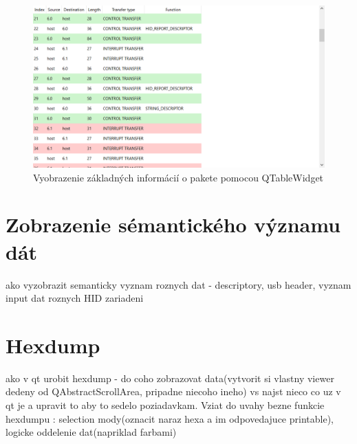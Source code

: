 \begin{figure}[!htb]
	\centering
	\includegraphics[width=\textwidth]{img/kap03_TableViewLookColor}
	\caption{Vyobrazenie základných informácií o pakete pomocou QTableWidget}
	\label{obr:kap3:TableViewLookColor}
\end{figure}



\section{Zobrazenie sémantického významu dát}
ako vyzobrazit semanticky vyznam roznych dat - descriptory, usb header, vyznam input dat roznych HID zariadeni
\section{Hexdump}
ako v qt urobit hexdump - do coho zobrazovat data(vytvorit si vlastny viewer dedeny od QAbstractScrollArea, pripadne niecoho ineho) vs najst nieco co uz v qt je a upravit to aby to sedelo poziadavkam. Vziat do uvahy bezne funkcie hexdumpu : selection mody(oznacit naraz hexa a im odpovedajuce printable), logicke oddelenie dat(napriklad farbami)








